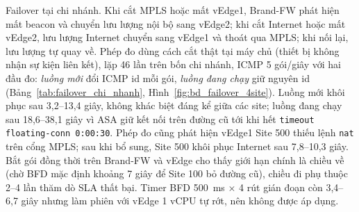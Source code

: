 Failover tại chi nhánh. Khi cắt MPLS hoặc mất vEdge1, Brand-FW phát hiện mất beacon và chuyển lưu lượng nội bộ sang vEdge2; khi cắt Internet hoặc mất vEdge2, lưu lượng Internet chuyển sang vEdge1 và thoát qua MPLS; khi nối lại, lưu lượng tự quay về. Phép đo dùng cách cắt thật tại máy chủ (thiết bị không nhận sự kiện liên kết), lặp 46 lần trên bốn chi nhánh, ICMP 5 gói/giây với hai đầu đo: \textit{luồng mới} đổi ICMP id mỗi gói, \textit{luồng đang chạy} giữ nguyên id (Bảng~\ref{tab:failover_chi_nhanh}, Hình~\ref{fig:bd_failover_4site}). Luồng mới khôi phục sau 3,2--13,4 giây, không khác biệt đáng kể giữa các site; luồng đang chạy sau 18,6--38,1 giây vì ASA giữ kết nối trên đường cũ tới khi hết \texttt{timeout floating-conn 0:00:30}. Phép đo cũng phát hiện vEdge1 Site 500 thiếu lệnh \texttt{nat} trên cổng MPLS; sau khi bổ sung, Site 500 khôi phục Internet sau 7,8--10,3 giây. Bắt gói đồng thời trên Brand-FW và vEdge cho thấy giới hạn chính là chiều về (chờ BFD mặc định khoảng 7 giây để Site 100 bỏ đường cũ), chiều đi phụ thuộc 2--4 lần thăm dò SLA thất bại. Timer BFD 500~ms $\times$ 4 rút gián đoạn còn 3,4--6,7 giây nhưng làm phiên với vEdge 1 vCPU tự rớt, nên không được áp dụng.

